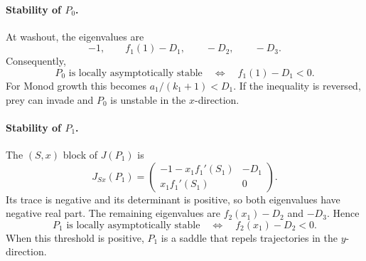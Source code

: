 \paragraph{Stability of \(P_0\).}
At washout, the eigenvalues are
\begin{equation}
-1,\qquad f_1(1)-D_1,\qquad -D_2,\qquad -D_3.
\end{equation}
Consequently,
\begin{equation}
\label{eq:p0-stability}
P_0\text{ is locally asymptotically stable}
\quad\Longleftrightarrow\quad f_1(1)-D_1<0.
\end{equation}
For Monod growth this becomes
\(a_1/(k_1+1)<D_1\).  If the inequality is reversed, prey can invade and
\(P_0\) is unstable in the \(x\)-direction.

\paragraph{Stability of \(P_1\).}
The \((S,x)\) block of \(J(P_1)\) is
\[
J_{Sx}(P_1)=
\begin{pmatrix}
-1-x_1f_1'(S_1)&-D_1\\
x_1f_1'(S_1)&0
\end{pmatrix}.
\]
Its trace is negative and its determinant is positive, so both eigenvalues
have negative real part.  The remaining eigenvalues are
\(
f_2(x_1)-D_2
\)
and \(-D_3\).  Hence
\begin{equation}
\label{eq:p1-stability}
P_1\text{ is locally asymptotically stable}
\quad\Longleftrightarrow\quad f_2(x_1)-D_2<0.
\end{equation}
When this threshold is positive, \(P_1\) is a saddle that repels trajectories
in the \(y\)-direction.

